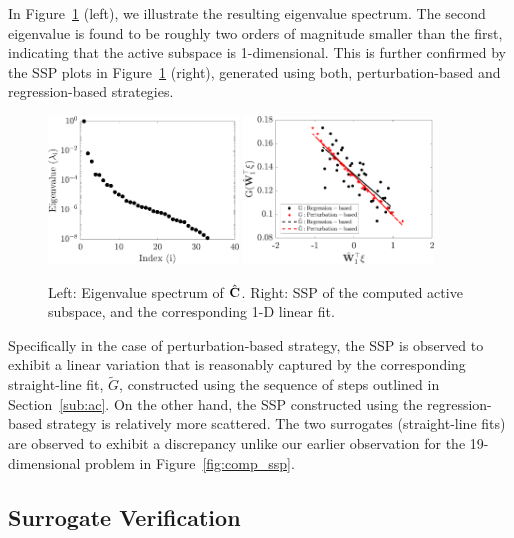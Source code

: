 In Figure~\ref{fig:hd} (left), we illustrate the resulting eigenvalue spectrum. The second eigenvalue is
found to be roughly two orders of magnitude smaller than the first, indicating that the active subspace
is 1-dimensional. This is further confirmed by the SSP plots in Figure~\ref{fig:hd} (right), generated
using both, perturbation-based and regression-based strategies. 
%
\begin{figure}[htbp]
 \begin{center}
   \includegraphics[width=0.45\textwidth]{./Figures/eig_33D}
   \includegraphics[width=0.45\textwidth]{./Figures/ssp_33D}
\caption{Left: Eigenvalue spectrum of $\hat{\mathbf{{C}}}$. Right: SSP of the computed active subspace, and the
corresponding 1-D linear fit.} 
\label{fig:hd}
\end{center}
\end{figure}
%
Specifically
in the case of perturbation-based strategy, the SSP is observed to exhibit a linear variation that
is reasonably
captured by the corresponding straight-line fit, $\tilde{G}$, constructed using the sequence of steps
outlined in Section~\ref{sub:ac}.
On the other hand, the SSP constructed using the regression-based strategy
is relatively more scattered. The two surrogates (straight-line fits) are observed to exhibit a
discrepancy unlike our earlier observation for the 19-dimensional problem in Figure~\ref{fig:comp_ssp}. 

\subsection{Surrogate Verification}
\label{sub:verify}

